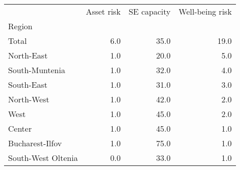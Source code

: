 \begin{tabular}{lrrr}
\toprule
{} &  Asset risk &  SE capacity &  Well-being risk \\
Region             &             &              &                  \\
\midrule
Total              &         6.0 &         35.0 &             19.0 \\
North-East         &         1.0 &         20.0 &              5.0 \\
South-Muntenia     &         1.0 &         32.0 &              4.0 \\
South-East         &         1.0 &         31.0 &              3.0 \\
North-West         &         1.0 &         42.0 &              2.0 \\
West               &         1.0 &         45.0 &              2.0 \\
Center             &         1.0 &         45.0 &              1.0 \\
Bucharest-Ilfov    &         1.0 &         75.0 &              1.0 \\
South-West Oltenia &         0.0 &         33.0 &              1.0 \\
\bottomrule
\end{tabular}
